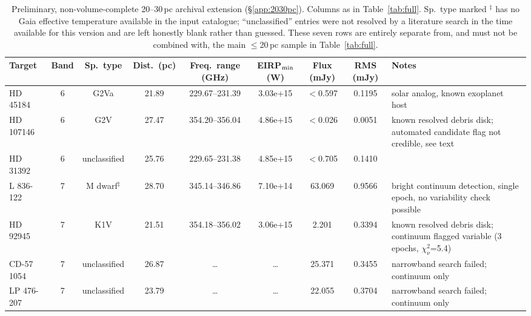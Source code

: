 \documentclass{openjournal}
\begin{document}
\begin{table}
\centering
\scriptsize
\caption{Preliminary, non-volume-complete 20--30\,pc archival extension
(\S\ref{app:2030pc}). Columns as in Table~\ref{tab:full}. Sp.\ type
marked $^\ddagger$ has no Gaia effective temperature available in the
input catalogue; ``unclassified'' entries were not resolved by a
literature search in the time available for this version and are left
honestly blank rather than guessed. These seven rows are entirely
separate from, and must not be combined with, the main $\leq$20\,pc
sample in Table~\ref{tab:full}.}
\label{tab:2030}
\begin{tabularx}{\textwidth}{@{}l c c c c c c c X@{}}
\hline
Target & Band & Sp.\ type & Dist.\ (pc) & Freq.\ range (GHz) & EIRP$_{\rm min}$ (W) & Flux (mJy) & RMS (mJy) & Notes \\
\hline
HD 45184 & 6 & G2Va & 21.89 & 229.67--231.39 & 3.03e+15 & $<$0.597 & 0.1195 & solar analog, known exoplanet host \\
HD 107146 & 6 & G2V & 27.47 & 354.20--356.04 & 4.86e+15 & $<$0.026 & 0.0051 & known resolved debris disk; automated candidate flag not credible, see text \\
HD 31392 & 6 & unclassified & 25.76 & 229.65--231.38 & 4.85e+15 & $<$0.705 & 0.1410 &  \\
L 836-122 & 7 & M dwarf$^\ddagger$ & 28.70 & 345.14--346.86 & 7.10e+14 & 63.069 & 0.9566 & bright continuum detection, single epoch, no variability check possible \\
HD 92945 & 7 & K1V & 21.51 & 354.18--356.02 & 3.06e+15 & 2.201 & 0.3394 & known resolved debris disk; continuum flagged variable (3 epochs, $\chi^2_\nu$=5.4) \\
CD-57 1054 & 7 & unclassified & 26.87 & \ldots & \ldots & 25.371 & 0.3455 & narrowband search failed; continuum only \\
LP 476-207 & 7 & unclassified & 23.79 & \ldots & \ldots & 22.055 & 0.3704 & narrowband search failed; continuum only \\
\hline
\end{tabularx}
\end{table}
\end{document}
